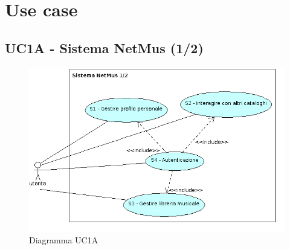 \chapter{Use case}
\thispagestyle{fancy}

\section{UC1A - Sistema NetMus (1/2)}

\begin{figure}[h]
  \centering
  \includegraphics[width=14cm]{img/AR/UC1A.png}
\caption{Diagramma UC1A}
\end{figure}

